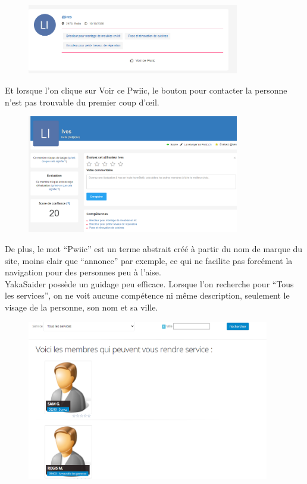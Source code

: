\documentclass[a4paper,11pt]{article}
\begin{document}
\begin{figure}[H]
  \includegraphics[width=350px]{images/guidage-pwiic.png}
  \label{fig:guidage-pwiic}
\end{figure}

Et lorsque l’on clique sur Voir ce Pwiic, le bouton pour contacter la personne n’est pas trouvable du premier coup d’œil.\\

\begin{figure}[H]
  \includegraphics[width=350px]{images/voir-ce-pwiic.png}
  \label{fig:voir-ce-pwiic}
\end{figure}

De plus, le mot “Pwiic” est un terme abstrait créé à partir du nom de marque du site, moins clair que “annonce”
par exemple, ce qui ne facilite pas forcément la navigation pour des personnes peu à l’aise.\\

YakaSaider possède un guidage peu efficace. Lorsque l’on recherche pour “Tous les services”, on ne voit aucune
compétence ni même description, seulement le visage de la personne, son nom et sa ville.\\

\begin{figure}[H]
  \includegraphics[width=400px]{images/guidage-yakasaider.png}
  \label{fig:guidage-yakasaider}
\end{figure}
\end{document}
